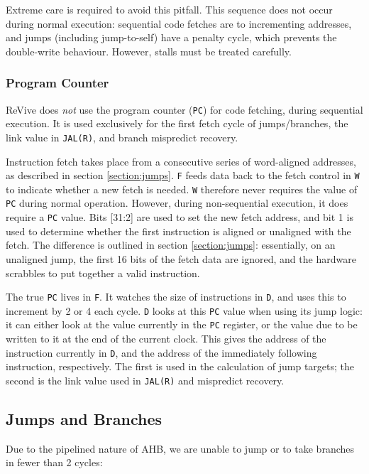 \documentclass{article}
\begin{document}
Extreme care is required to avoid this pitfall. This sequence does not occur during normal execution: sequential code fetches are to incrementing addresses, and jumps (including jump-to-self) have a penalty cycle, which prevents the double-write behaviour. However, stalls must be treated carefully.

\subsubsection{Program Counter}

ReVive does \textit{not} use the program counter (\texttt{PC}) for code fetching, during sequential execution. It is used exclusively for the first fetch cycle of jumps/branches, the link value in \texttt{JAL(R)}, and branch mispredict recovery.

Instruction fetch takes place from a consecutive series of word-aligned addresses, as described in section \ref{section:jumps}. \texttt{F} feeds data back to the fetch control in \texttt{W} to indicate whether a new fetch is needed. \texttt{W} therefore never requires the value of \texttt{PC} during normal operation. However, during non-sequential execution, it does require a \texttt{PC} value. Bits [31:2] are used to set the new fetch address, and bit 1 is used to determine whether the first instruction is aligned or unaligned with the fetch. The difference is outlined in section \ref{section:jumps}: essentially, on an unaligned jump, the first 16 bits of the fetch data are ignored, and the hardware scrabbles to put together a valid instruction.

The true \texttt{PC} lives in \texttt{F}. It watches the size of instructions in \texttt{D}, and uses this to increment by 2 or 4 each cycle. \texttt{D} looks at this \texttt{PC} value when using its jump logic: it can either look at the value currently in the \texttt{PC} register, or the value due to be written to it at the end of the current clock. This gives the address of the instruction currently in \texttt{D}, and the address of the immediately following instruction, respectively. The first is used in the calculation of jump targets; the second is the link value used in \texttt{JAL(R)} and mispredict recovery.

\subsection{Jumps and Branches}


Due to the pipelined nature of AHB, we are unable to jump or to take branches in fewer than 2 cycles:
\end{document}
